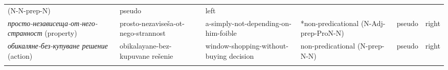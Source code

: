 \documentclass[output=paper]{LSP/langsci}
\begin{document}
\begin{sidewaystable}
\begin{tabularx}{\textwidth}{QQQQp{1.5cm}l}
(N-N-prep-N) & pseudo & left\\
\textit{{просто-независеща-от-него-странност}}
\newline 
(property) & prosto-nezaviseša-ot-nego-strannost & a-simply-not-depending-on-him-foible & *non-predicational
\newline 
(N-Adj-prep-ProN-N) & pseudo & right\\
\textit{{обикаляне-без-купуване решение}}
\newline 
(action) & obikalayane-bez-kupuvane rešenie & window-shopping-without-buying decision & non-predicational
\newline 
(N-prep-N-N) & pseudo & right\\

\lspbottomrule
\end{tabularx}
\end{sidewaystable}
\end{document}
